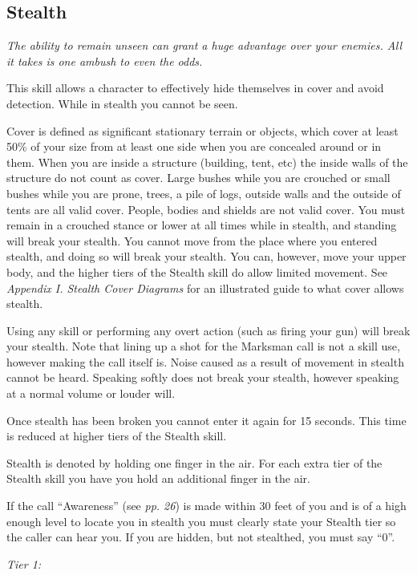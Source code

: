 \subsection{Stealth}

\textit{The ability to remain unseen can grant a huge advantage over your enemies. All it takes is one ambush to even the odds.}

This skill allows a character to effectively hide themselves in cover and avoid detection. While in stealth you cannot be seen.

Cover is defined as significant stationary terrain or objects, which cover at least 50\% of your size from at least one side when you are concealed around or in them. When you are inside a structure (building, tent, etc) the inside walls of the structure do not count as cover. Large bushes while you are crouched or small bushes while you are prone, trees, a pile of logs, outside walls and the outside of tents are all valid cover. People, bodies and shields are not valid cover. You must remain in a crouched stance or lower at all times while in stealth, and standing will break your stealth. You cannot move from the place where you entered stealth, and doing so will break your stealth. You can, however, move your upper body, and the higher tiers of the Stealth skill do allow limited movement. See \textit{Appendix I. Stealth Cover Diagrams} for an illustrated guide to what cover allows stealth.

Using any skill or performing any overt action (such as firing your gun) will break your stealth. Note that lining up a shot for the Marksman call is not a skill use, however making the call itself is. Noise caused as a result of movement in stealth cannot be heard. Speaking softly does not break your stealth, however speaking at a normal volume or louder will.

Once stealth has been broken you cannot enter it again for 15 seconds. This time is reduced at higher tiers of the Stealth skill.

Stealth is denoted by holding one finger in the air. For each extra tier of the Stealth skill you have you hold an additional finger in the air.

If the call ``Awareness'' (see \textit{pp. 26}) is made within 30 feet of you and is of a high enough level to locate you in stealth you must clearly state your Stealth tier so the caller can hear you. If you are hidden, but not stealthed, you must say ``0''.

\textit{Tier 1:}

